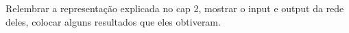 Relembrar a representação explicada no cap 2, mostrar o input e output da rede deles, colocar alguns resultados que eles obtiveram.


